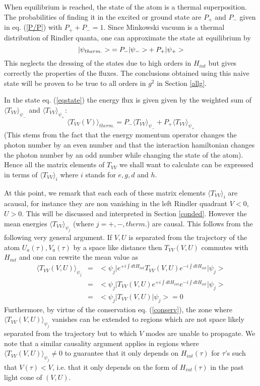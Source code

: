 When equilibrium is reached, the state of the atom is a thermal
superposition. The probabilities of finding it in the excited or
ground state are $P_+$ and $P_-$ given in eq. (\ref{P/P}) with
$P_++P_-=1$.
Since Minkowski vacuum is a thermal distribution of Rindler quanta, one
can approximate the state at equilibrium by
\begin{equation}
\mbox{$ \vert \psi_{therm.} > $} = P_- \mbox{$ \vert \psi_- > $} + P_+ \mbox{$ \vert \psi_+ > $}
\label{eqstate}
\end{equation}
This neglects the dressing of the states due to high orders in $H_{int}$
but gives correctly the properties of the fluxes. The
conclusions obtained using this naive state will be proven to be true to all
orders in $g^2$ in Section \ref{allg}.

In the state eq. (\ref{eqstate}) the energy flux is given given by the weighted
sum of
$\langle T_{VV}\rangle _{\psi_-}$ and $\langle T_{VV}\rangle _{\psi_+}$:
\begin{equation}
\langle T_{VV}(V)\rangle _{therm.} =
P_-
\langle T_{VV}\rangle _{\psi_-}
+ P_+
\langle T_{VV}\rangle _{\psi_+}
\label{eqT}
\end{equation}
(This stems from the fact that
the energy momentum operator changes the photon number by an even number and
that the interaction hamiltonian changes the photon number by an odd number
while changing the state of the atom).
Hence all the matrix elements of $T_{VV}$ we shall want to calculate can be
expressed in terms of $\langle T_{VV}\rangle _i$ where $i$ stands
for
$e,
g,
d$ and $h$.

At this point, we remark that
each each of these matrix elements $\langle T_{VV}\rangle _i$
are acausal, for instance they are non vanishing in the left Rindler quadrant
$V<0$,
$U>0$. This will be discussed and interpreted in Section \ref{conded}.
 However the
mean  energies
$\langle T_{VV}\rangle _{\psi_j}$
(where $j= +,-,therm.$) are causal. This follows from the following very
general
argument\cite{UnWa}. If $V,U$ is separated from the trajectory of the
atom $U_a(\tau),
V_a(\tau)$
by a space like distance then $T_{VV}(V,U)$ commutes with $H_{int}$
and one can
rewrite
the mean value as
\begin{eqnarray}
\langle T_{VV}(V,U) \rangle_{\psi_j} &=&
< \psi_j \vert e^{+i\int dt H_{int}} T_{VV}(V,U) e^{-i\int dt
H_{int}}\vert\psi_j > \nonumber\\
&=& < \psi_j \vert  T_{VV}(V,U) e^{+i\int dt H_{int}}e^{-i\int dt
H_{int}}\vert\psi_j > \nonumber\\
&=& < \psi_j \vert  T_{VV}(V,U) \vert\psi_j > =0
\label{van}
\end{eqnarray}
Furthermore, by virtue of  the conservation eq. (\ref{conserv}), the
 zone where $\langle T_{VV}(V,U)
\rangle_{\psi_j}$ vanishes
can be extended to regions which are not space likely
separated
from
the trajectory but to which $V$ modes are unable to propagate.
We note that a  similar causality argument applies in regions where $\langle
T_{VV}(V,U)
\rangle_{\psi_j} \neq 0$ to guarantee that it only depends on $H_{int}(\tau)$
for $\tau$'s
such
that
$V(\tau) < V$, i.e. that it only depends on the form of $H_{int}(\tau)$ in the
past
light
cone of $(V,U)$.


